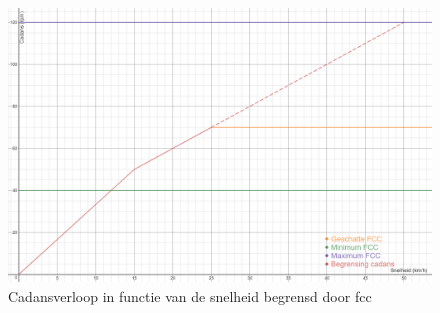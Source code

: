 \documentclass[12pt,a4paper,oneside]{book}
\begin{document}
\begin{figure}
  \includegraphics[width=\linewidth]{images/cadansverloop.png}
  \caption{Cadansverloop in functie van de snelheid begrensd door fcc}
  \label{fig:cadansverloop}
\end{figure}
\newpage
\end{document}
